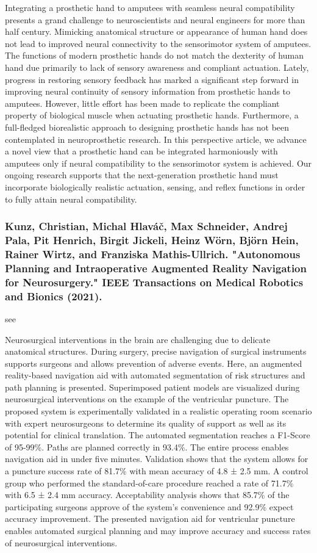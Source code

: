 \documentclass[conference]{IEEEtran}
\begin{document}
Integrating a prosthetic hand to amputees with seamless neural compatibility presents a grand challenge to neuroscientists and neural engineers for more than half century. Mimicking anatomical structure or appearance of human hand does not lead to improved neural connectivity to the sensorimotor system of amputees. The functions of modern prosthetic hands do not match the dexterity of human hand due primarily to lack of sensory awareness and compliant actuation. Lately, progress in restoring sensory feedback has marked a significant step forward in improving neural continuity of sensory information from prosthetic hands to amputees. However, little effort has been made to replicate the compliant property of biological muscle when actuating prosthetic hands. Furthermore, a full-fledged biorealistic approach to designing prosthetic hands has not been contemplated in neuroprosthetic research. In this perspective article, we advance a novel view that a prosthetic hand can be integrated harmoniously with amputees only if neural compatibility to the sensorimotor system is achieved. Our ongoing research supports that the next-generation prosthetic hand must incorporate biologically realistic actuation, sensing, and reflex functions in order to fully attain neural compatibility.

\medskip
\subsubsection{Kunz, Christian, Michal Hlaváč, Max Schneider, Andrej Pala, Pit Henrich, Birgit Jickeli, Heinz Wörn, Björn Hein, Rainer Wirtz, and Franziska Mathis-Ullrich. "Autonomous Planning and Intraoperative Augmented Reality Navigation for Neurosurgery." IEEE Transactions on Medical Robotics and Bionics (2021).}
see \cite{kunz2021autonomous}

Neurosurgical interventions in the brain are challenging due to delicate anatomical structures. During surgery, precise navigation of surgical instruments supports surgeons and allows prevention of adverse events. Here, an augmented reality-based navigation aid with automated segmentation of risk structures and path planning is presented. Superimposed patient models are visualized during neurosurgical interventions on the example of the ventricular puncture. The proposed system is experimentally validated in a realistic operating room scenario with expert neurosurgeons to determine its quality of support as well as its potential for clinical translation. The automated segmentation reaches a F1-Score of 95-99\%. Paths are planned correctly in 93.4\%. The entire process enables navigation aid in under five minutes. Validation shows that the system allows for a puncture success rate of 81.7\% with mean accuracy of 4.8 ± 2.5 mm. A control group who performed the standard-of-care procedure reached a rate of 71.7\% with 6.5 ± 2.4 mm accuracy. Acceptability analysis shows that 85.7\% of the participating surgeons approve of the system’s convenience and 92.9\% expect accuracy improvement. The presented navigation aid for ventricular puncture enables automated surgical planning and may improve accuracy and success rates of neurosurgical interventions.
\end{document}
